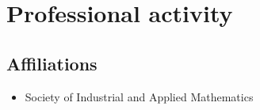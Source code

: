 %
%

\section{Professional activity}

%

\subsection{Affiliations}

\begin{itemize}
    \item Society of Industrial and Applied Mathematics
\end{itemize}


